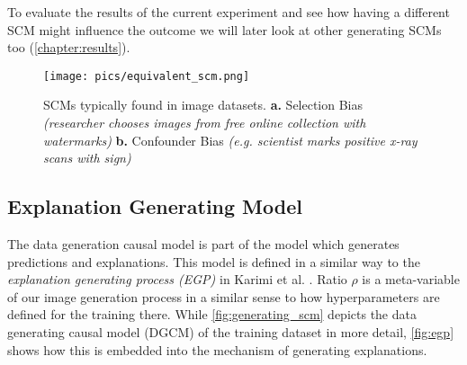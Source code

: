 To evaluate the results of the current experiment and see how having a different SCM might influence the outcome we will later look at other generating SCMs too (\cref{chapter:results}).

\begin{figure}[H]
    \centering
    \texttt{[image: pics/equivalent\_scm.png]}
    \caption[Selection vs. Confounder Bias]{SCMs typically found in image datasets.
    \textbf{a.} Selection Bias \textit{(researcher chooses images from free online collection with watermarks)}
    \textbf{b.} Confounder Bias \textit{(e.g. scientist marks positive x-ray scans with sign)}}
    \label{fig:equivalent_scm}
\end{figure}

\subsection{Explanation Generating Model}
The data generation causal model is part of the model which generates predictions and explanations.
This model is defined in a similar way to the \textit{explanation generating process (EGP)} in Karimi et al. \cite{Karimi2023}.
Ratio $\rho$ is a meta-variable of our image generation process in a similar sense to how hyperparameters are defined for the training there. While \cref{fig:generating_scm} depicts the data generating causal model (DGCM) of the training dataset in more detail, \cref{fig:egp} shows how this is embedded into the mechanism of generating explanations. 

